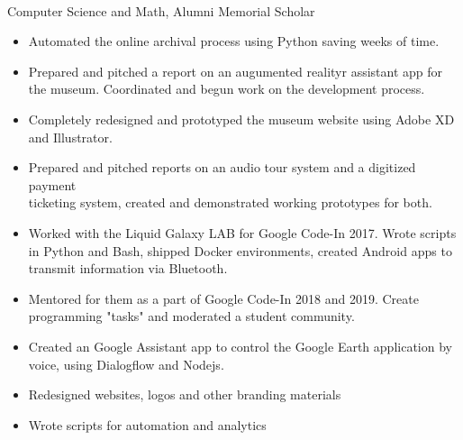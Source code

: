 \documentclass[a4paper]{resume}
\begin{document}
\vspace*{-40pt}


\\Computer Science and Math, Alumni Memorial Scholar
\enresection


\begin{itemize} \vspace{-5pt} \itemsep -2pt
	\item Automated the online archival process using Python saving weeks of time.
	\item Prepared and pitched a report on an augumented realityr assistant app for the museum. Coordinated and begun work on the development process.
	\item Completely redesigned and prototyped the museum website using Adobe XD and Illustrator.
\item Prepared and pitched reports on an audio tour system and a digitized payment\\ticketing system, created and demonstrated working prototypes for both.
\end{itemize}

\begin{itemize} \vspace{-5pt} \itemsep -2pt
	\item Worked with the Liquid Galaxy LAB for Google Code-In 2017. Wrote scripts in Python and Bash, shipped Docker environments, created Android apps to transmit information via Bluetooth.
	\item Mentored for them as a part of Google Code-In 2018 and 2019. Create programming "tasks" and moderated a student community.
	\item Created an Google Assistant app to control the Google Earth application by voice, using Dialogflow and Nodejs.
\end{itemize}

\begin{itemize} \vspace{-5pt} \itemsep -2pt
	\item Redesigned websites, logos and other branding materials
	\item Wrote scripts for automation and analytics
\end{itemize}
\end{document}
